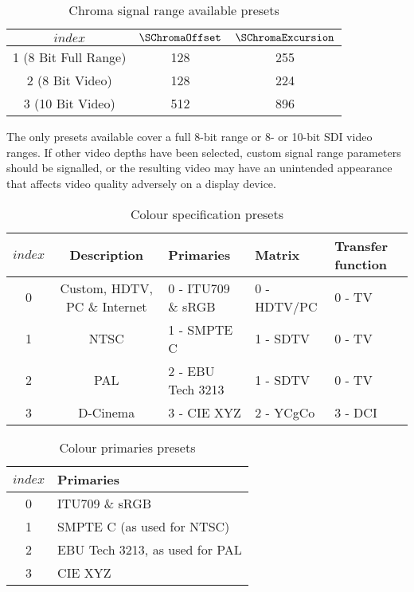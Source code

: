 \begin{table}[!ht]
\centering
\begin{tabular}{|c|c|c|}
\hline
$index$ & $\SChromaOffset$ & $\SChromaExcursion$ \\
\hline
1 (8 Bit Full Range) & 128 & 255 \\
\hline
2 (8 Bit Video) & 128 & 224 \\
\hline
3 (10 Bit Video) & 512 & 896 \\
\hline
\end{tabular}
\caption{Chroma signal range available presets}\label{chromasignalrangevalues}
\end{table}

\begin{informative}
The only presets available cover a full 8-bit range or 8- or 10-bit SDI video ranges.
If other video depths have been selected, custom signal range parameters
should be signalled, or the resulting video may have an unintended appearance that
affects video quality adversely on a display device.
\end{informative}

\begin{table}[!ht]
\centering
\begin{tabular}{|c|c|l|l|l|}
\hline
$index$ & {\bf Description}           & {\bf Primaries}       & {\bf Matrix}  & {\bf Transfer function}\\
\hline
0 & Custom, HDTV, PC \& Internet & 0 - ITU709 \& sRGB & 0 - HDTV/PC & 0 - TV \\ 
\hline
1 & NTSC                                    & 1 - SMPTE C           & 1 - SDTV      & 0 - TV \\
\hline
2 & PAL                                       & 2 - EBU Tech 3213   & 1 - SDTV      & 0 - TV \\
\hline
3 & D-Cinema                              & 3 - CIE XYZ             & 2 - YCgCo     & 3 - DCI \\
\hline
\end{tabular}
\caption{Colour specification presets}\label{colourspecvalues}
\end{table}

\begin{table}[!ht]
\centering
\begin{tabular}{|c|l|}
\hline
$index$ &  {\bf Primaries}      \\
\hline
0          &  ITU709 \& sRGB  \\ 
\hline
1          &  SMPTE C (as used for NTSC)          \\
\hline
2          &  EBU Tech 3213, as used for PAL   \\
\hline
3          & CIE XYZ              \\
\hline
\end{tabular}
\caption{Colour primaries presets}\label{primariesvalues}
\end{table}


